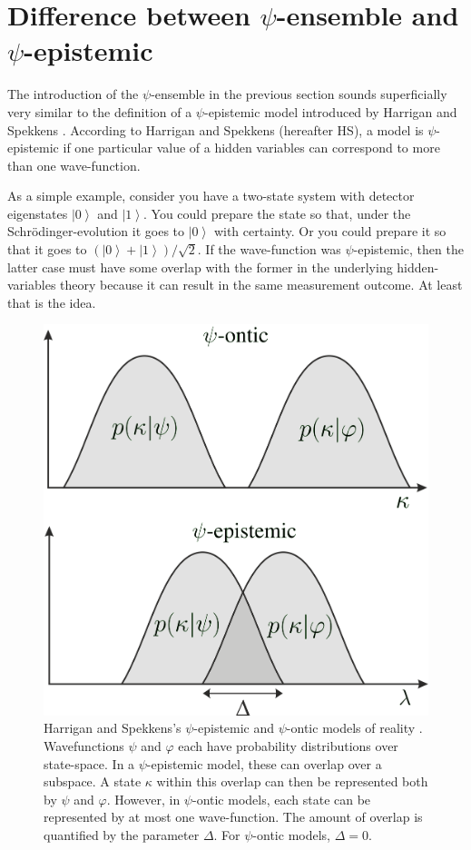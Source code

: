 \documentclass[superscriptaddress,floatfix,nofootinbib,12pt]{revtex4-2}
\newcommand{\ket}[1]{\left| #1 \right\rangle}
\begin{document}
\section{Difference between \texorpdfstring{$\psi$}{psi}-ensemble and \texorpdfstring{$\psi$}{psi}-epistemic}
\label{onticepistemic}


The introduction of the $\psi$-ensemble in the previous section sounds superficially very similar to the definition of a $\psi$-epistemic model introduced by Harrigan and Spekkens \cite{Harrigan2010OMF}. According to Harrigan and Spekkens (hereafter HS), a model is $\psi$-epistemic if one particular value of a hidden variables can correspond to more than one wave-function. 

As a simple example, consider you have a two-state system with detector eigenstates $\ket{0}$ and $\ket{1}$. You could prepare the state so that, under the Schr\"odinger-evolution it goes to $\ket{0}$ with certainty. Or you could prepare it so that it goes to $(\ket{0} + \ket{1})/\sqrt{2}$. If the wave-function was $\psi$-epistemic, then the latter case must have some overlap with the former in the underlying hidden-variables theory because it can result in the same measurement outcome. At least that is the idea.

\begin{figure}
    \centering
    \includegraphics[width=\linewidth]{episont.png}
    \caption{Harrigan and Spekkens's $\psi$-epistemic and $\psi$-ontic models of reality \cite{Harrigan2010OMF}. Wavefunctions $\psi$ and $\varphi$ each have probability distributions over state-space. In a $\psi$-epistemic model, these can overlap over a subspace. A state $\kappa$ within this overlap can then be represented both by $\psi$ and $\varphi$. However, in $\psi$-ontic models, each state can be represented by at most one wave-function. The amount of overlap is quantified by the parameter $\Delta$. For $\psi$-ontic models, $\Delta =0$.}
    \label{fig:Graphs}
\end{figure}
\end{document}
